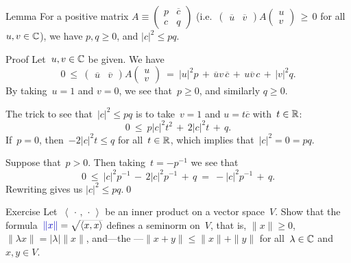 \documentclass[a]{subfiles}
\begin{document}
\begin{parsec}[hilb]
\begin{point}{Lemma}
For a positive matrix $A\equiv 
\left(\begin{smallmatrix}p & \overline{c} \\ c & q\end{smallmatrix}\right)$
(i.e.~$\left(
\begin{smallmatrix}\overline{u}&\overline{v}\end{smallmatrix}\right)
A
\left(\begin{smallmatrix}u \\ v \end{smallmatrix}\right) \,\geq \, 0$
for all~$u,v\in \mathbb{C}$),
we have
$p,q\geq 0$, and $\left|c\right|^2 \leq pq$.
\begin{point}{Proof}%
Let~$u,v\in\mathbb{C}$ be given.
We have
\begin{equation*}
0\ \leq\ 
\left(\begin{smallmatrix}\overline{u}&\overline{v}\end{smallmatrix}\right)
A
\left(\begin{smallmatrix}u \\ v \end{smallmatrix}\right)
\ = \ 
\left|u\right|^2 p\,+\, 
\overline{u}v\,\overline{c} \,+\,
u\overline{v}\,c \,+\,
\left|v\right|^2 q.
\end{equation*}
By taking~$u=1$ and $v=0$, we see that~$p\geq 0$,
and similarly $q\geq 0$.

The trick to see that~$\left|c\right|^2\leq pq$
is to
take~$v=1$ and $u=t\overline{c}$ with~$t\in \mathbb{R}$:
\begin{equation*}
0 \ \leq\ p\left|c\right|^2t^2
\,+\,2\left|c\right|^2t 
\,+\, q.
\end{equation*}
If~$p=0$, then~$-2\left|c\right|^2t \leq q $
for all~$t\in \mathbb{R}$,
which implies that~$\left|c\right|^2=0=pq$.

Suppose that~$p>0$.
Then taking~$t=-p^{-1}$ we see that
\begin{equation*}
0 \ \leq\ \left|c\right|^2p^{-1}
\,-\,2\left|c\right|^2p^{-1} 
\,+\, q \ = \ -\left|c\right|^2p^{-1}\,+\,q.
\end{equation*}
Rewriting gives us
 $\left|c\right|^2\leq pq$.\qed
\end{point}
\end{point}
\begin{point}[inner-product-basic]{Exercise}%
Let~$\left<\,\cdot\,,\,\cdot\,\right>$
be an inner product on a vector space~$V$.
Show that
the formula~$\Define{\|x\|}=\smash{\sqrt{\left<x,x\right>}}$
defines a seminorm on~$V$,
that is,
$\|x\|\geq 0$,
$\|\lambda x\|=\left|\lambda\right|\|x\|$,
and---the ---$\|x+y\|\leq \|x\|+\|y\|$
for all~$\lambda\in \mathbb{C}$ and~$x,y\in V$.


\end{point}
\end{parsec}
\end{document}
